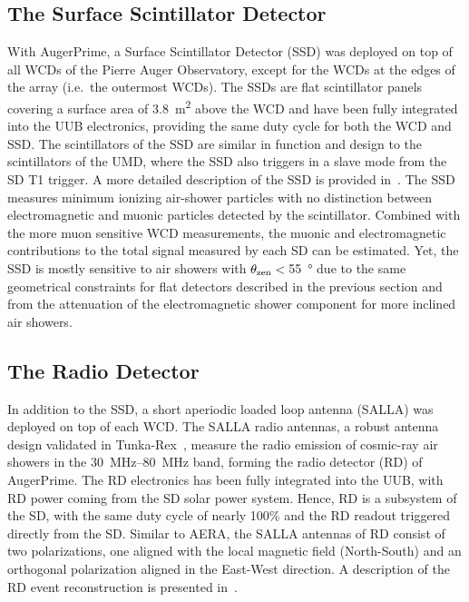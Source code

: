 

\subsection{The Surface Scintillator Detector}\label{ssec:ssd}
With AugerPrime, a Surface Scintillator Detector (SSD) was deployed on top of all WCDs of the Pierre Auger Observatory, except for the WCDs at the edges of the array (i.e.~the outermost WCDs).
The SSDs are flat scintillator panels covering a surface area of \qty{3.8}{\meter^{2}} above the WCD and have been fully integrated into the UUB electronics, providing the same duty cycle for both the WCD and SSD.
The scintillators of the SSD are similar in function and design to the scintillators of the UMD, where the SSD also triggers in a slave mode from the SD T1 trigger.
A more detailed description of the SSD is provided in~\cite{auger_jinst2025_ssd}.
The SSD measures minimum ionizing air-shower particles with no distinction between electromagnetic and muonic particles detected by the scintillator.
Combined with the more muon sensitive WCD measurements, the muonic and electromagnetic contributions to the total signal measured by each SD can be estimated.
Yet, the SSD is mostly sensitive to air showers with $\theta_{\rm zen}<\,$\qty{55}{\degree} due to the same geometrical constraints for flat detectors described in the previous section and from the attenuation of the electromagnetic shower component for more inclined air showers.

\subsection{The Radio Detector}\label{ssec:rd}
In addition to the SSD, a short aperiodic loaded loop antenna (SALLA) was deployed on top of each WCD.
The SALLA radio antennas, a robust antenna design validated in Tunka-Rex~\cite{tunkarex_jcap2015_radiomeasurements}, measure the radio emission of cosmic-ray air showers in the \qtyrange{30}{80}{\mega\hertz} band, forming the radio detector (RD) of AugerPrime.
The RD electronics has been fully integrated into the UUB, with RD power coming from the SD solar power system.
Hence, RD is a subsystem of the SD, with the same duty cycle of nearly 100\% and the RD readout triggered directly from the SD.
Similar to AERA, the SALLA antennas of RD consist of two polarizations, one aligned with the local magnetic field (North-South) and an orthogonal polarization aligned in the East-West direction.
A description of the RD event reconstruction is presented in~\cite{auger_icrc2025_rdreconstruction}.

